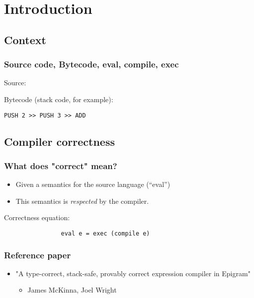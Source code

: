 \section{Introduction}

    \subsection{Context}

\begin{frame}[fragile]
            \frametitle{Source code, Bytecode, eval, compile, exec}

            Source:

            Bytecode (stack code, for example):
            \begin{verbatim}
PUSH 2 >> PUSH 3 >> ADD
            \end{verbatim}
\end{frame}


    \subsection{Compiler correctness}
        \begin{frame}
            \frametitle{What does "correct" mean?}

            \begin{itemize}
                \item Given a semantics for the source language (``eval'')
                \item This semantics is \emph{respected} by the compiler.
            \end{itemize}

            Correctness equation:
            \begin{verbatim}
                eval e = exec (compile e)
            \end{verbatim}
        \end{frame}

        \begin{frame}
            \frametitle{Reference paper}
            \begin{itemize}
                \item "A type-correct, stack-safe, provably correct expression compiler in Epigram"
                    \begin{itemize}
                        \item James McKinna, Joel Wright
                    \end{itemize}
            \end{itemize}
        \end{frame}
    

